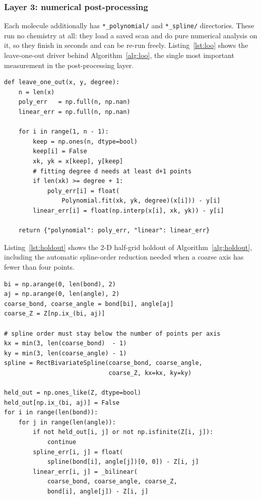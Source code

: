 \documentclass[sigconf,screen,nonacm]{acmart}
\begin{document}
\subsubsection{Layer 3: numerical post-processing}

Each molecule additionally has \texttt{*\_polynomial/} and \texttt{*\_spline/}
directories. These run no chemistry at all: they load a saved scan and do
pure numerical analysis on it, so they finish in seconds and can be re-run
freely. Listing~\ref{lst:loo} shows the leave-one-out driver behind
Algorithm~\ref{alg:loo}, the single most important measurement in the
post-processing layer.

\begin{lstlisting}[caption={Leave-one-out cross-validation at the interior
nodes. Endpoints return \texttt{NaN} because withholding one turns the
problem into extrapolation; nodes where the remaining data cannot support the
requested degree are excluded the same way.},
label={lst:loo}]
def leave_one_out(x, y, degree):
    n = len(x)
    poly_err   = np.full(n, np.nan)
    linear_err = np.full(n, np.nan)

    for i in range(1, n - 1):
        keep = np.ones(n, dtype=bool)
        keep[i] = False
        xk, yk = x[keep], y[keep]
        # fitting degree d needs at least d+1 points
        if len(xk) >= degree + 1:
            poly_err[i] = float(
                Polynomial.fit(xk, yk, degree)(x[i])) - y[i]
        linear_err[i] = float(np.interp(x[i], xk, yk)) - y[i]

    return {"polynomial": poly_err, "linear": linear_err}
\end{lstlisting}

Listing~\ref{lst:holdout} shows the 2-D half-grid holdout of
Algorithm~\ref{alg:holdout}, including the automatic spline-order reduction
needed when a coarse axis has fewer than four points.

\begin{lstlisting}[caption={Half-grid holdout for surfaces. Taking every
other value on each axis keeps the subgrid rectangular, which leave-one-out
cannot do, while withholding roughly three quarters of the points.},
label={lst:holdout}]
bi = np.arange(0, len(bond), 2)
aj = np.arange(0, len(angle), 2)
coarse_bond, coarse_angle = bond[bi], angle[aj]
coarse_Z = Z[np.ix_(bi, aj)]

# spline order must stay below the number of points per axis
kx = min(3, len(coarse_bond)  - 1)
ky = min(3, len(coarse_angle) - 1)
spline = RectBivariateSpline(coarse_bond, coarse_angle,
                             coarse_Z, kx=kx, ky=ky)

held_out = np.ones_like(Z, dtype=bool)
held_out[np.ix_(bi, aj)] = False
for i in range(len(bond)):
    for j in range(len(angle)):
        if not held_out[i, j] or not np.isfinite(Z[i, j]):
            continue
        spline_err[i, j] = float(
            spline(bond[i], angle[j])[0, 0]) - Z[i, j]
        linear_err[i, j] = _bilinear(
            coarse_bond, coarse_angle, coarse_Z,
            bond[i], angle[j]) - Z[i, j]
\end{lstlisting}
\end{document}
